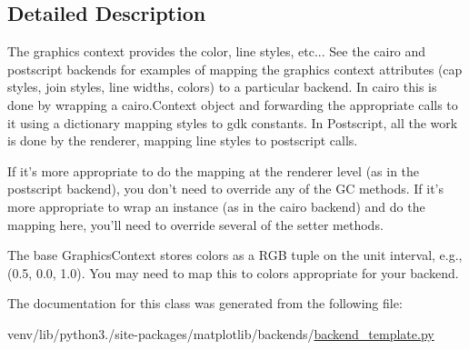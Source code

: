 \subsection{Detailed Description}
\begin{DoxyVerb}The graphics context provides the color, line styles, etc...  See the cairo
and postscript backends for examples of mapping the graphics context
attributes (cap styles, join styles, line widths, colors) to a particular
backend.  In cairo this is done by wrapping a cairo.Context object and
forwarding the appropriate calls to it using a dictionary mapping styles
to gdk constants.  In Postscript, all the work is done by the renderer,
mapping line styles to postscript calls.

If it's more appropriate to do the mapping at the renderer level (as in
the postscript backend), you don't need to override any of the GC methods.
If it's more appropriate to wrap an instance (as in the cairo backend) and
do the mapping here, you'll need to override several of the setter
methods.

The base GraphicsContext stores colors as a RGB tuple on the unit
interval, e.g., (0.5, 0.0, 1.0). You may need to map this to colors
appropriate for your backend.
\end{DoxyVerb}
 

The documentation for this class was generated from the following file\+:\begin{DoxyCompactItemize}
\item 
venv/lib/python3./site-\/packages/matplotlib/backends/\hyperlink{backend__template_8py}{backend\+\_\+template.\+py}\end{DoxyCompactItemize}

